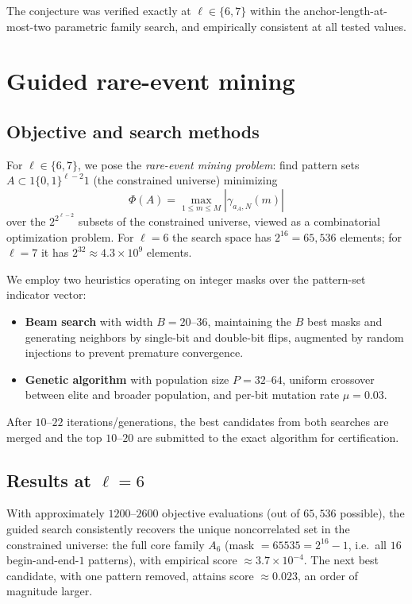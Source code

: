 \documentclass[11pt]{article}
\theoremstyle{definition}
\begin{document}
The conjecture was verified exactly at $\ell \in \{6, 7\}$ within the
anchor-length-at-most-two parametric family search, and empirically
consistent at all tested values.

\section{Guided rare-event mining}
\label{sec:mining}

\subsection{Objective and search methods}

For $\ell \in \{6, 7\}$, we pose the \emph{rare-event mining problem}:
find pattern sets $A \subset 1\{0,1\}^{\ell-2}1$ (the constrained
universe) minimizing
\[
    \Phi(A) = \max_{1 \leq m \leq M} |\gamma_{a_A,N}(m)|
\]
over the $2^{2^{\ell-2}}$ subsets of the constrained universe, viewed
as a combinatorial optimization problem. For $\ell = 6$ the search
space has $2^{16} = 65{,}536$ elements; for $\ell = 7$ it has
$2^{32} \approx 4.3 \times 10^9$ elements.

We employ two heuristics operating on integer masks over the
pattern-set indicator vector:
\begin{itemize}[leftmargin=2em]
  \item \textbf{Beam search} with width $B = 20$--$36$, maintaining
        the $B$ best masks and generating neighbors by single-bit and
        double-bit flips, augmented by random injections to prevent
        premature convergence.
  \item \textbf{Genetic algorithm} with population size $P = 32$--$64$,
        uniform crossover between elite and broader population, and
        per-bit mutation rate $\mu = 0.03$.
\end{itemize}
After $10$--$22$ iterations/generations, the best candidates from both
searches are merged and the top $10$--$20$ are submitted to the exact
algorithm for certification.

\subsection{Results at $\ell = 6$}

With approximately $1200$--$2600$ objective evaluations
(out of $65{,}536$ possible), the guided search consistently recovers
the unique noncorrelated set in the constrained universe: the full core
family $A_6$ (mask $= 65535 = 2^{16}-1$, i.e.\ all $16$ begin-and-end-$1$
patterns), with empirical score $\approx 3.7 \times 10^{-4}$. The next
best candidate, with one pattern removed, attains score $\approx 0.023$,
an order of magnitude larger.
\end{document}
